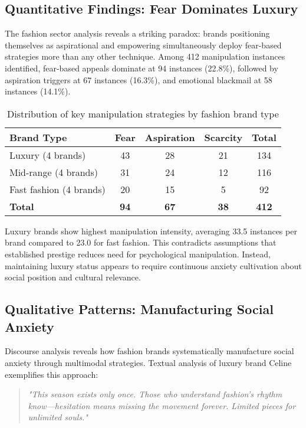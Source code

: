 \subsection{Quantitative Findings: Fear Dominates Luxury}

The fashion sector analysis reveals a striking paradox: brands positioning themselves as aspirational and empowering simultaneously deploy fear-based strategies more than any other technique. Among 412 manipulation instances identified, fear-based appeals dominate at 94 instances (22.8\%), followed by aspiration triggers at 67 instances (16.3\%), and emotional blackmail at 58 instances (14.1\%).

\begin{table}[h]
\centering
\begin{tabular}{|l|c|c|c|c|}
\hline
\textbf{Brand Type} & \textbf{Fear} & \textbf{Aspiration} & \textbf{Scarcity} & \textbf{Total} \\
\hline
Luxury (4 brands) & 43 & 28 & 21 & 134 \\
Mid-range (4 brands) & 31 & 24 & 12 & 116 \\
Fast fashion (4 brands) & 20 & 15 & 5 & 92 \\
\hline
\textbf{Total} & \textbf{94} & \textbf{67} & \textbf{38} & \textbf{412} \\
\hline
\end{tabular}
\caption{Distribution of key manipulation strategies by fashion brand type}
\end{table}

Luxury brands show highest manipulation intensity, averaging 33.5 instances per brand compared to 23.0 for fast fashion. This contradicts assumptions that established prestige reduces need for psychological manipulation. Instead, maintaining luxury status appears to require continuous anxiety cultivation about social position and cultural relevance.

\subsection{Qualitative Patterns: Manufacturing Social Anxiety}

Discourse analysis reveals how fashion brands systematically manufacture social anxiety through multimodal strategies. Textual analysis of luxury brand Celine exemplifies this approach:

\begin{quote}
\textit{"This season exists only once. Those who understand fashion's rhythm know—hesitation means missing the movement forever. Limited pieces for unlimited souls."}
\end{quote}

